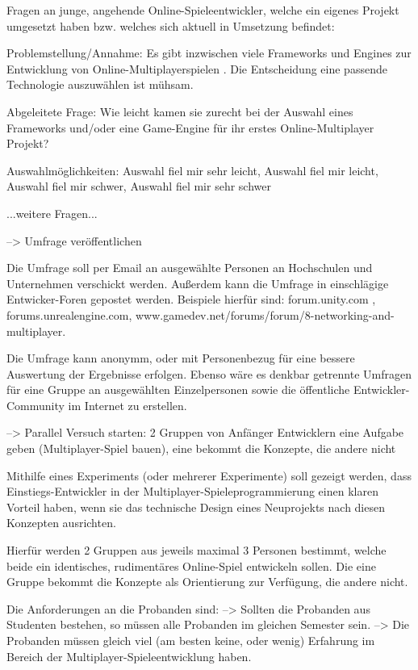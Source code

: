Fragen an junge, angehende Online-Spieleentwickler, welche ein eigenes Projekt umgesetzt haben bzw. welches sich aktuell in Umsetzung befindet:

Problemstellung/Annahme: Es gibt inzwischen viele Frameworks und Engines zur Entwicklung von Online-Multiplayerspielen \cite{MFatihMAR.2021}. Die Entscheidung eine passende Technologie auszuwählen ist mühsam.

Abgeleitete Frage: Wie leicht kamen sie zurecht bei der Auswahl eines Frameworks und/oder eine Game-Engine für ihr erstes Online-Multiplayer Projekt?

Auswahlmöglichkeiten: Auswahl fiel mir sehr leicht, Auswahl fiel mir leicht, Auswahl fiel mir schwer, Auswahl fiel mir sehr schwer

...weitere Fragen...

	--> Umfrage veröffentlichen
	
Die Umfrage soll per Email an ausgewählte Personen an Hochschulen und Unternehmen verschickt werden. Außerdem kann die Umfrage in einschlägige Entwicker-Foren gepostet werden. Beispiele hierfür sind: forum.unity.com , forums.unrealengine.com, www.gamedev.net/forums/forum/8-networking-and-multiplayer.

Die Umfrage kann anonymm, oder mit Personenbezug für eine bessere Auswertung der Ergebnisse erfolgen. Ebenso wäre es denkbar getrennte Umfragen für eine Gruppe an ausgewählten Einzelpersonen sowie die öffentliche Entwickler-Community im Internet zu erstellen.
	
	--> Parallel Versuch starten: 2 Gruppen von Anfänger Entwicklern eine Aufgabe geben (Multiplayer-Spiel bauen), eine bekommt die Konzepte, die andere nicht
	
Mithilfe eines Experiments (oder mehrerer Experimente) soll gezeigt werden, dass Einstiegs-Entwickler in der Multiplayer-Spieleprogrammierung einen klaren Vorteil haben, wenn sie das technische Design eines Neuprojekts nach diesen Konzepten ausrichten.

Hierfür werden 2 Gruppen aus jeweils maximal 3 Personen bestimmt, welche beide ein identisches, rudimentäres Online-Spiel entwickeln sollen. Die eine Gruppe bekommt die Konzepte als Orientierung zur Verfügung, die andere nicht.

Die Anforderungen an die Probanden sind:
--> Sollten die Probanden aus Studenten bestehen, so müssen alle Probanden im gleichen Semester sein.
--> Die Probanden müssen gleich viel (am besten keine, oder wenig) Erfahrung im Bereich der Multiplayer-Spieleentwicklung haben.

